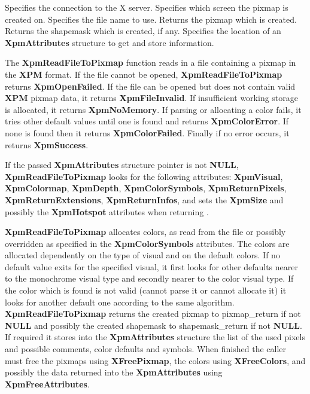 \begin{description}

 Specifies the connection to the X server.
 Specifies which screen the pixmap is created on.
 Specifies the file name to use.
 Returns the pixmap which is created.
 Returns the shapemask which is created, if any.
 Specifies the location of an {\bf XpmAttributes} structure
to get and store information.

\end{description} 

The {\bf XpmReadFileToPixmap} function reads in a file containing a pixmap in
the {\bf XPM} format. If the file cannot be opened, {\bf XpmReadFileToPixmap}
returns {\bf XpmOpenFailed}. If the file can be opened but does not
contain valid {\bf XPM} pixmap data, it returns {\bf XpmFileInvalid}. If
insufficient working storage is allocated, it returns {\bf XpmNoMemory}.
If parsing or allocating a color fails, it tries other default values until
one is found and returns {\bf XpmColorError}. If none is found then it
returns {\bf XpmColorFailed}. Finally if no error occurs, it returns
{\bf XpmSuccess}.

If the passed {\bf XpmAttributes} structure pointer is not {\bf NULL}, {\bf
XpmReadFileToPixmap} looks for the following attributes: {\bf XpmVisual}, {\bf
XpmColormap}, {\bf XpmDepth}, {\bf XpmColorSymbols}, {\bf XpmReturnPixels},
{\bf XpmReturnExtensions}, {\bf XpmReturnInfos}, and sets the {\bf XpmSize}
and possibly the {\bf XpmHotspot} attributes when returning .

{\bf XpmReadFileToPixmap} allocates colors, as read from the file or possibly
overridden as specified in the {\bf XpmColorSymbols} attributes. The colors
are allocated dependently on the type of visual and on the default colors. If
no default value exits for the specified visual, it first looks for other
defaults nearer to the monochrome visual type and secondly nearer to the color
visual type. If the color which is found is not valid (cannot parse it or
cannot allocate it) it looks for another default one according to the same
algorithm. {\bf XpmReadFileToPixmap} returns the created pixmap to
pixmap\_return if not {\bf NULL} and possibly the created shapemask to
shapemask\_return if not {\bf NULL}. If required it stores into the {\bf
XpmAttributes} structure the list of the used pixels and possible comments,
color defaults and symbols. When finished the caller must free the pixmaps
using {\bf XFreePixmap}, the colors using {\bf XFreeColors}, and possibly the
data returned into the {\bf XpmAttributes} using {\bf XpmFreeAttributes}.

